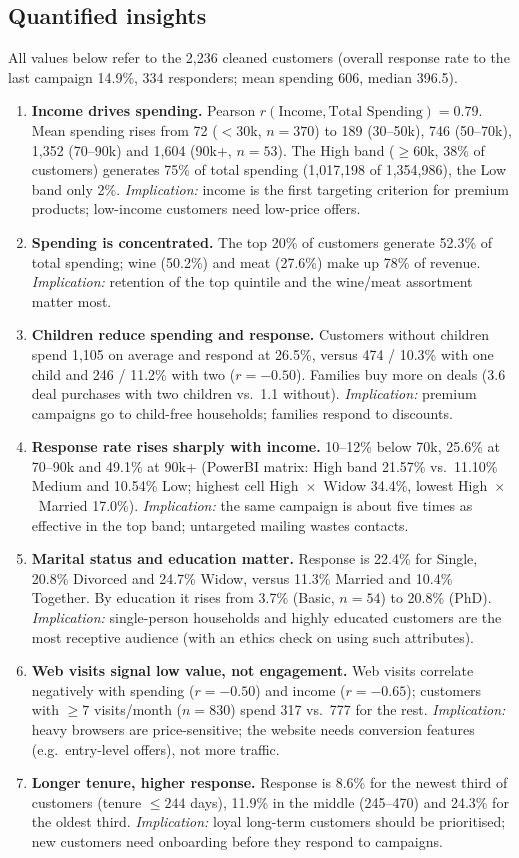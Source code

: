 \documentclass[11pt]{article}
\begin{document}
\subsection{Quantified insights}
All values below refer to the 2{,}236 cleaned customers (overall response rate to the last
campaign 14.9\%, 334 responders; mean spending 606, median 396.5).
\begin{enumerate}
\item \textbf{Income drives spending.} Pearson $r(\text{Income},\text{Total Spending}) = 0.79$.
Mean spending rises from 72 ($<$30k, $n=370$) to 189 (30--50k), 746 (50--70k), 1{,}352
(70--90k) and 1{,}604 (90k+, $n=53$). The High band ($\ge$60k, 38\% of customers) generates 75\% of total
spending (1{,}017{,}198 of 1{,}354{,}986), the Low band only 2\%. \emph{Implication:} income is the first targeting
criterion for premium products; low-income customers need low-price offers.
\item \textbf{Spending is concentrated.} The top 20\% of customers generate 52.3\% of total
spending; wine (50.2\%) and meat (27.6\%) make up 78\% of revenue. \emph{Implication:}
retention of the top quintile and the wine/meat assortment matter most.
\item \textbf{Children reduce spending and response.} Customers without children spend 1{,}105
on average and respond at 26.5\%, versus 474 / 10.3\% with one child and 246 / 11.2\% with two
($r = -0.50$). Families buy more on deals (3.6 deal purchases with two children vs.\ 1.1 without).
\emph{Implication:} premium campaigns go to child-free households; families respond to discounts.
\item \textbf{Response rate rises sharply with income.} 10--12\% below 70k, 25.6\% at 70--90k
and 49.1\% at 90k+ (PowerBI matrix: High band 21.57\% vs.\ 11.10\% Medium and 10.54\% Low; highest
cell High~$\times$~Widow 34.4\%, lowest High~$\times$~Married 17.0\%). \emph{Implication:} the same
campaign is about five times as effective in the top band; untargeted mailing wastes contacts.
\item \textbf{Marital status and education matter.} Response is 22.4\% for Single, 20.8\%
Divorced and 24.7\% Widow, versus 11.3\% Married and 10.4\% Together. By education it rises
from 3.7\% (Basic, $n=54$) to 20.8\% (PhD). \emph{Implication:} single-person households and
highly educated customers are the most receptive audience (with an ethics check on using such
attributes).
\item \textbf{Web visits signal low value, not engagement.} Web visits correlate negatively with
spending ($r=-0.50$) and income ($r=-0.65$); customers with $\ge 7$ visits/month ($n=830$) spend
317 vs.\ 777 for the rest. \emph{Implication:} heavy browsers are price-sensitive; the website
needs conversion features (e.g.\ entry-level offers), not more traffic.
\item \textbf{Longer tenure, higher response.} Response is 8.6\% for the newest third of
customers (tenure $\le 244$ days), 11.9\% in the middle (245--470) and 24.3\% for the oldest third.
\emph{Implication:} loyal long-term customers should be prioritised; new customers need
onboarding before they respond to campaigns.
\end{enumerate}
\end{document}
